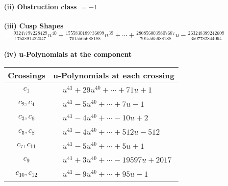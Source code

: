 \documentclass[1p]{elsarticle_modified}
\theoremstyle{definition}
\begin{document}
\flushleft \textbf{(ii) Obstruction class $= -1$}\\~\\
\flushleft \textbf{(iii) Cusp Shapes $= \frac{93247797228429}{1753891422047} u^{40}+\frac{1555830189736099}{7015565688188} u^{39}+\cdots+\frac{2808560039807687}{7015565688188} u-\frac{263248389242609}{3507782844094}$}\\~\\
\newpage\renewcommand{\arraystretch}{1}
\flushleft \textbf{(iv) u-Polynomials at the component}\newline \\
\begin{tabular}{m{50pt}|m{274pt}}
Crossings & \hspace{64pt}u-Polynomials at each crossing \\
\hline $$\begin{aligned}c_{1}\end{aligned}$$&$\begin{aligned}
&u^{41}+29 u^{40}+\cdots+71 u+1
\end{aligned}$\\
\hline $$\begin{aligned}c_{2},c_{4}\end{aligned}$$&$\begin{aligned}
&u^{41}-5 u^{40}+\cdots+7 u-1
\end{aligned}$\\
\hline $$\begin{aligned}c_{3},c_{6}\end{aligned}$$&$\begin{aligned}
&u^{41}-4 u^{40}+\cdots-10 u+2
\end{aligned}$\\
\hline $$\begin{aligned}c_{5},c_{8}\end{aligned}$$&$\begin{aligned}
&u^{41}-4 u^{40}+\cdots+512 u-512
\end{aligned}$\\
\hline $$\begin{aligned}c_{7},c_{11}\end{aligned}$$&$\begin{aligned}
&u^{41}-5 u^{40}+\cdots+5 u+1
\end{aligned}$\\
\hline $$\begin{aligned}c_{9}\end{aligned}$$&$\begin{aligned}
&u^{41}+3 u^{40}+\cdots-19597 u+2017
\end{aligned}$\\
\hline $$\begin{aligned}c_{10},c_{12}\end{aligned}$$&$\begin{aligned}
&u^{41}-9 u^{40}+\cdots+95 u-1
\end{aligned}$\\
\hline
\end{tabular}\\~\\
\end{document}
